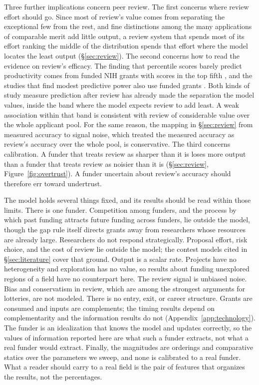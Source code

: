 \documentclass[article, 11pt, reqno]{amsart}
\theoremstyle{named}
\begin{document}
Three further implications concern peer review. The first concerns where review
effort should go. Since most of review's value comes from separating the exceptional
few from the rest, and fine distinctions among the many applications of comparable
merit add little output, a review system that spends most of its effort ranking the
middle of the distribution spends that effort where the model locates the least
output (\S\ref{sec:review}). The second concerns how to read the evidence on review's
efficacy. The finding that percentile scores barely predict productivity comes from
funded NIH grants with scores in the top fifth \citep{Fang2016}, and the studies that
find modest predictive power also use funded grants \citep{LiAgha2015}. Both kinds of
study measure prediction after review has already made the separation the model
values, inside the band where the model expects review to add least. A weak
association within that band is consistent with review of considerable value over
the whole applicant pool. For the same reason, the mapping in \S\ref{sec:review} from
measured accuracy to signal noise, which treated the measured accuracy as review's
accuracy over the whole pool, is conservative. The third concerns calibration. A
funder that treats review as sharper than it is loses more output than a funder that
treats review as noisier than it is (\S\ref{sec:review}, Figure~\ref{fig:overtrust}).
A funder uncertain about review's accuracy should therefore err toward undertrust.

The model holds several things fixed, and its results should be read within those
limits. There is one funder. Competition among funders, and the process by which past
funding attracts future funding across funders, lie outside the model, though the gap
rule itself directs grants away from researchers whose resources are already large.
Researchers do not respond strategically. Proposal effort, risk choice, and the cost
of review lie outside the model; the contest models cited in \S\ref{sec:literature}
cover that ground. Output is a scalar rate. Projects have no heterogeneity and
exploration has no value, so results about funding unexplored regions of a field have
no counterpart here. The review signal is unbiased noise. Bias and conservatism in
review, which are among the strongest arguments for lotteries, are not modeled. There
is no entry, exit, or career structure. Grants are consumed and inputs are
complements; the timing results depend on complementarity and the information
results do not (Appendix~\ref{app:technology}). The funder is an idealization that
knows the model and updates correctly, so the values of information reported here
are what such a funder extracts, not what a real funder would extract. Finally, the
magnitudes are orderings and comparative statics over the parameters we sweep, and
none is calibrated to a real funder. What a reader should carry to a real field is
the pair of features that organizes the results, not the percentages.
\end{document}
